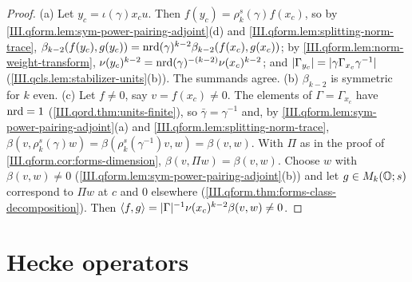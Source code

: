 \begin{lemma}
\end{lemma}
\begin{proof}
(a) Let $y_c=\iota(\gamma)x_cu$. Then $f(y_c)=\rho_k^s(\gamma)f(x_c)$, so by \cref{III.qform.lem:sym-power-pairing-adjoint}(d) and
\cref{III.qform.lem:splitting-norm-trace}, $\beta_{k-2}(f(y_c),g(y_c))=\operatorname{nrd}(\gamma)^{k-2}\beta_{k-2}(f(x_c),g(x_c))$; by
\cref{III.qform.lem:norm-weight-transform}, $\nu(y_c)^{k-2}=\operatorname{nrd}(\gamma)^{-(k-2)}\nu(x_c)^{k-2}$; and $\lvert\Gamma_{y_c}\rvert=\lvert\gamma\Gamma_{x_c}\gamma^{-1}\rvert$
(\cref{III.qcls.lem:stabilizer-units}(b)). The summands agree. (b) $\beta_{k-2}$ is symmetric for $k$ even. (c) Let $f\ne0$, say $v=f(x_c)\ne0$. The
elements of $\Gamma=\Gamma_{x_c}$ have $\operatorname{nrd}=1$ (\cref{III.qord.thm:units-finite}), so $\bar\gamma=\gamma^{-1}$ and, by
\cref{III.qform.lem:sym-power-pairing-adjoint}(a) and \cref{III.qform.lem:splitting-norm-trace}, $\beta(v,\rho_k^s(\gamma)w)=\beta(\rho_k^s(\gamma^{-1})v,w)=\beta(v,w)$.
With $\Pi$ as in the proof of \cref{III.qform.cor:forms-dimension}, $\beta(v,\Pi w)=\beta(v,w)$. Choose $w$ with $\beta(v,w)\ne0$
(\cref{III.qform.lem:sym-power-pairing-adjoint}(b)) and let $g\in M_k(\mathbb{O};s)$ correspond to $\Pi w$ at $c$ and $0$ elsewhere
(\cref{III.qform.thm:forms-class-decomposition}). Then $\langle f,g\rangle=\lvert\Gamma\rvert^{-1}\nu(x_c)^{k-2}\beta(v,w)\ne0$.
\end{proof}

\section{Hecke operators}\label{sec:brandt-hecke}

\begin{definition}
\end{definition}

